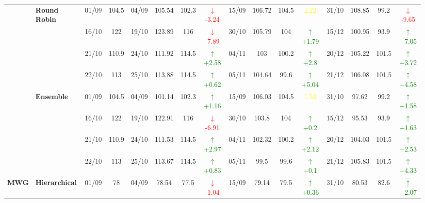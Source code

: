 \documentclass{ieeeaccess}
\begin{document}
{\begin{longtable}{llcc|cccc|cccc|cccc}
& \textbf{Round Robin}
& 01/09 & 104.5 & 04/09 & 105.54 & 102.3 & \textcolor{red}{\(\downarrow\)-3.24} & 15/09 & 106.72 & 104.5 & \textcolor{yellow}{2.22} & 31/10 & 108.85 & 99.2 & \textcolor{red}{\(\downarrow\)-9.65} \\

&
& 16/10 & 122 & 19/10 & 123.89 & 116 & \textcolor{red}{\(\downarrow\)-7.89} & 30/10 & 105.79 & 104 & \textcolor{green}{\(\uparrow\)+1.79} & 15/12 & 100.95 & 93.9 & \textcolor{green}{\(\uparrow\)+7.05} \\

&
& 21/10 & 110.9 & 24/10 & 111.92 & 114.5 & \textcolor{green}{\(\uparrow\)+2.58} & 04/11 & 103 & 100.2 & \textcolor{green}{\(\uparrow\)+2.8} & 20/12 & 105.22 & 101.5 & \textcolor{green}{\(\uparrow\)+3.72} \\

&
& 22/10 & 113 & 25/10 & 113.88 & 114.5 & \textcolor{green}{\(\uparrow\)+0.62} & 05/11 & 104.64 & 99.6 & \textcolor{green}{\(\uparrow\)+5.04} & 21/12 & 106.08 & 101.5 & \textcolor{green}{\(\uparrow\)+4.58} \\
\cmidrule(lr){2-16}


& \textbf{Ensemble}
& 01/09 & 104.5 & 04/09 & 101.14 & 102.3 & \textcolor{green}{\(\uparrow\)+1.16} & 15/09 & 106.03 & 104.5 & \textcolor{yellow}{1.53} & 31/10 & 97.62 & 99.2 & \textcolor{green}{\(\uparrow\)+1.58} \\

&
& 16/10 & 122 & 19/10 & 122.91 & 116 & \textcolor{red}{\(\downarrow\)-6.91} & 30/10 & 103.8 & 104 & \textcolor{green}{\(\uparrow\)+0.2} & 15/12 & 95.53 & 93.9 & \textcolor{green}{\(\uparrow\)+1.63} \\

&
& 21/10 & 110.9 & 24/10 & 111.53 & 114.5 & \textcolor{green}{\(\uparrow\)+2.97} & 04/11 & 102.32 & 100.2 & \textcolor{green}{\(\uparrow\)+2.12} & 20/12 & 104.03 & 101.5 & \textcolor{green}{\(\uparrow\)+2.53} \\

&
& 22/10 & 113 & 25/10 & 113.67 & 114.5 & \textcolor{green}{\(\uparrow\)+0.83} & 05/11 & 99.5 & 99.6 & \textcolor{green}{\(\uparrow\)+0.1} & 21/12 & 105.83 & 101.5 & \textcolor{green}{\(\uparrow\)+4.33} \\
\midrule




\multirow{12}{*}{\textbf{MWG}} 
& \textbf{Hierarchical}
& 01/09 & 78 & 04/09 & 78.54 & 77.5 & \textcolor{red}{\(\downarrow\)-1.04} & 15/09 & 79.14 & 79.5 & \textcolor{green}{\(\uparrow\)+0.36} & 31/10 & 80.53 & 82.6 & \textcolor{green}{\(\uparrow\)+2.07} \\


\end{longtable}}
\end{document}
